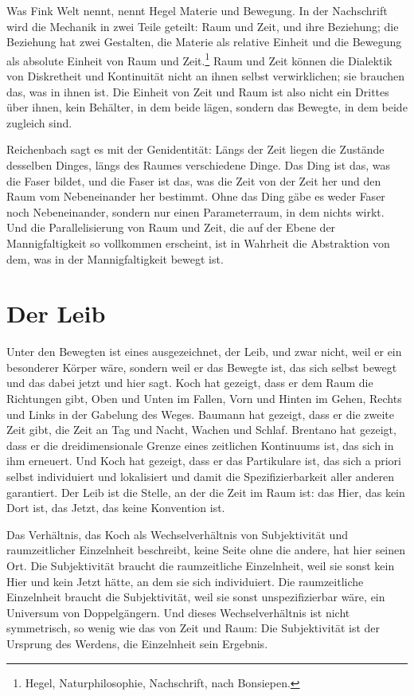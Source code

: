 Was Fink Welt nennt, nennt Hegel Materie und Bewegung. In der Nachschrift wird die Mechanik in zwei Teile geteilt: Raum und Zeit, und ihre Beziehung; die Beziehung hat zwei Gestalten, die Materie als relative Einheit und die Bewegung als absolute Einheit von Raum und Zeit.\footnote{Hegel, Naturphilosophie, Nachschrift, nach Bonsiepen.} Raum und Zeit können die Dialektik von Diskretheit und Kontinuität nicht an ihnen selbst verwirklichen; sie brauchen das, was in ihnen ist. Die Einheit von Zeit und Raum ist also nicht ein Drittes über ihnen, kein Behälter, in dem beide lägen, sondern das Bewegte, in dem beide zugleich sind.

Reichenbach sagt es mit der Genidentität: Längs der Zeit liegen die Zustände desselben Dinges, längs des Raumes verschiedene Dinge. Das Ding ist das, was die Faser bildet, und die Faser ist das, was die Zeit von der Zeit her und den Raum vom Nebeneinander her bestimmt. Ohne das Ding gäbe es weder Faser noch Nebeneinander, sondern nur einen Parameterraum, in dem nichts wirkt. Und die Parallelisierung von Raum und Zeit, die auf der Ebene der Mannigfaltigkeit so vollkommen erscheint, ist in Wahrheit die Abstraktion von dem, was in der Mannigfaltigkeit bewegt ist.

\section{Der Leib}

Unter den Bewegten ist eines ausgezeichnet, der Leib, und zwar nicht, weil er ein besonderer Körper wäre, sondern weil er das Bewegte ist, das sich selbst bewegt und das dabei jetzt und hier sagt. Koch hat gezeigt, dass er dem Raum die Richtungen gibt, Oben und Unten im Fallen, Vorn und Hinten im Gehen, Rechts und Links in der Gabelung des Weges. Baumann hat gezeigt, dass er die zweite Zeit gibt, die Zeit an Tag und Nacht, Wachen und Schlaf. Brentano hat gezeigt, dass er die dreidimensionale Grenze eines zeitlichen Kontinuums ist, das sich in ihm erneuert. Und Koch hat gezeigt, dass er das Partikulare ist, das sich a priori selbst individuiert und lokalisiert und damit die Spezifizierbarkeit aller anderen garantiert. Der Leib ist die Stelle, an der die Zeit im Raum ist: das Hier, das kein Dort ist, das Jetzt, das keine Konvention ist.

Das Verhältnis, das Koch als Wechselverhältnis von Subjektivität und raumzeitlicher Einzelnheit beschreibt, keine Seite ohne die andere, hat hier seinen Ort. Die Subjektivität braucht die raumzeitliche Einzelnheit, weil sie sonst kein Hier und kein Jetzt hätte, an dem sie sich individuiert. Die raumzeitliche Einzelnheit braucht die Subjektivität, weil sie sonst unspezifizierbar wäre, ein Universum von Doppelgängern. Und dieses Wechselverhältnis ist nicht symmetrisch, so wenig wie das von Zeit und Raum: Die Subjektivität ist der Ursprung des Werdens, die Einzelnheit sein Ergebnis.

